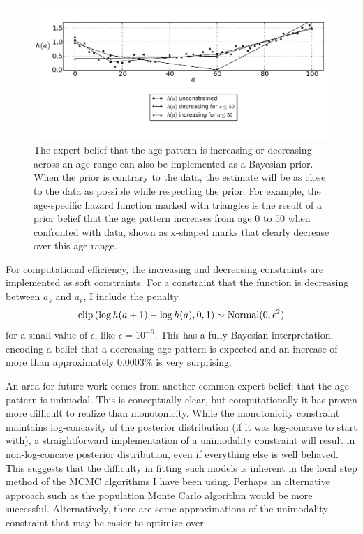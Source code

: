 \begin{figure}[h]
\begin{center}
\includegraphics[width=\textwidth]{monotone-smoothing-splines.pdf}
\caption{The expert belief that the age pattern is increasing or
  decreasing across an age range can also be implemented as a Bayesian
  prior.  When the prior is contrary to the data, the estimate will be
  as close to the data as possible while respecting the prior.  For
  example, the age-specific hazard function marked with triangles is the result
  of a prior belief that the age pattern increases from age $0$ to
  $50$ when confronted with data, shown as x-shaped marks that
  clearly decrease over this age range.}
\label{monotone-age-pattern}
\end{center}
\end{figure}


For computational efficiency, the increasing and decreasing
constraints are implemented as soft constraints.  For a constraint
that the function is decreasing between $a_s$ and $a_e$, I include the penalty
\[
\operatorname{clip}\left(\log h(a+1) - \log h(a), 0, 1\right) \sim \operatorname{Normal}(0, \epsilon^2)
\]
for a small value of $\epsilon$, like $\epsilon = 10^{-6}$.  This has
a fully Bayesian interpretation, encoding a belief that a decreasing age pattern is expected
and an increase of more than approximately $0.0003$\% is very surprising.


An area for future work comes from another common expert belief: that
the age pattern is unimodal.  This is conceptually clear, but
computationally it has proven more difficult to realize than
monotonicity.  While the monotonicity constraint maintains
log-concavity of the posterior distribution (if it was log-concave to
start with), a straightforward implementation of a unimodality
constraint will result in non-log-concave posterior distribution, even
if everything else is well behaved.  This suggests that the difficulty
in fitting such models is inherent in the local step method of the
MCMC algorithms I have been using.  Perhaps an alternative approach
such as the population Monte Carlo algorithm would be more successful.
Alternatively, there are some approximations of the unimodality
constraint that may be easier to optimize over.\cite{papp_shape_2012}

